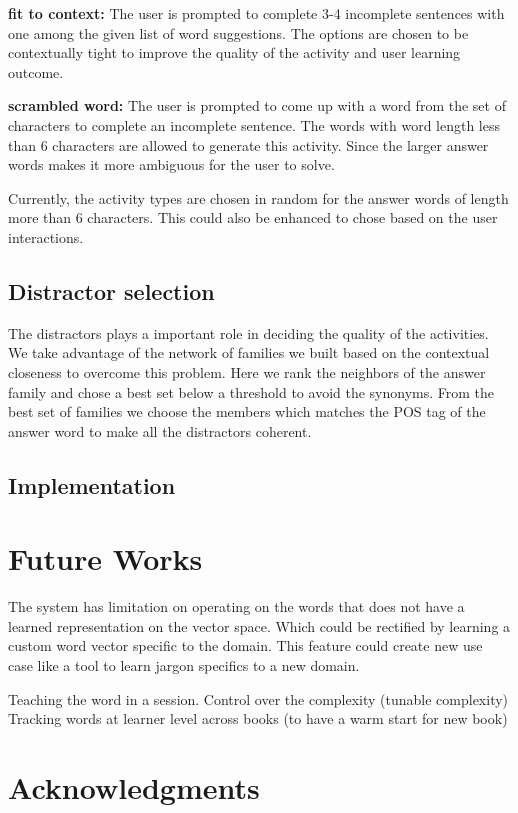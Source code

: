 \documentclass[11pt,a4paper]{article}
\begin{document}
\textbf{fit to context:} The user is prompted to complete 3-4 incomplete
sentences with one among the given list of word suggestions. The options are
chosen to be contextually tight to improve the quality of the activity and
user learning outcome.

\textbf{scrambled word:} The user is prompted to come up with a word from the
set of characters to complete an incomplete sentence. The words with word length
less than 6 characters are allowed to generate this activity. Since the larger
answer words makes it more ambiguous for the user to solve.

Currently, the activity types are chosen in random for the answer words of length
more than 6 characters. This could also be enhanced to chose based on the user
interactions.

\subsection{Distractor selection}
The distractors plays a important role in deciding the quality of the activities.
We take advantage of the network of families we built based on the contextual
closeness to overcome this problem. Here we rank the neighbors of the
answer family and chose a best set below a threshold to avoid the synonyms. From
the best set of families we choose the members which matches the POS tag of the
answer word to make all the distractors coherent.


\subsection{Implementation}

\section{Future Works}
The system has limitation on operating on the words that does not have a learned
representation on the vector space. Which could be rectified by learning a
custom word vector specific to the domain. This feature could create new use case
like a tool to learn jargon specifics to a new domain.

Teaching the word in a session.
Control over the complexity (tunable complexity)
Tracking words at learner level across books (to have a warm start for new book)


\section*{Acknowledgments}



\end{document}
